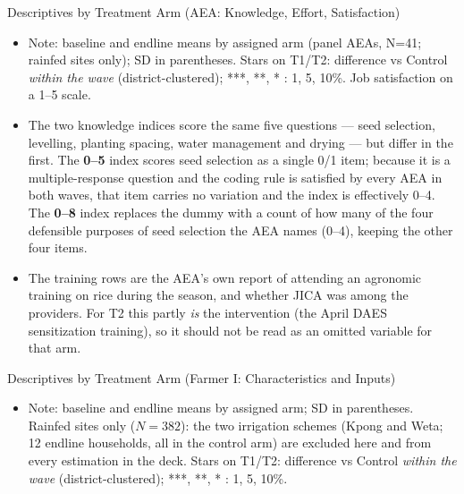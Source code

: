 \documentclass[aspectratio=169]{beamer}
\newcommand{\notefont}{\fontsize{5pt}{6pt}\selectfont}
\begin{document}
\begin{frame}{Descriptives by Treatment Arm (AEA: Knowledge, Effort, Satisfaction)}
	\centering
	\begin{itemize}\notefont
		\item Note: baseline and endline means by assigned arm (panel AEAs, N=41; rainfed sites only); SD in
		parentheses. Stars on T1/T2: difference vs Control \emph{within the wave}
		(district-clustered); ***, **, * : 1, 5, 10\%. Job satisfaction on a 1--5 scale.
		\item The two knowledge indices score the same five questions --- seed selection,
		levelling, planting spacing, water management and drying --- but differ in the first.
		The \textbf{0--5} index scores seed selection as a single 0/1 item; because it is a
		multiple-response question and the coding rule is satisfied by every AEA in both waves,
		that item carries no variation and the index is effectively 0--4. The \textbf{0--8}
		index replaces the dummy with a count of how many of the four defensible purposes of
		seed selection the AEA names (0--4), keeping the other four items.
		\item The training rows are the AEA's own report of attending an agronomic training on
		rice during the season, and whether JICA was among the providers. For T2 this partly
		\emph{is} the intervention (the April DAES sensitization training), so it should not be
		read as an omitted variable for that arm.
	\end{itemize}
\end{frame}

\begin{frame}{Descriptives by Treatment Arm (Farmer I: Characteristics and Inputs)}
	\centering
	\begin{itemize}\notefont
		\item Note: baseline and endline means by assigned arm; SD in parentheses. Rainfed sites
		only ($N=382$): the two irrigation schemes (Kpong and Weta; 12 endline households, all
		in the control arm) are excluded here and from every estimation in the deck.
		Stars on T1/T2: difference vs Control
		\emph{within the wave} (district-clustered); ***, **, * : 1, 5, 10\%.
	\end{itemize}
\end{frame}
\end{document}

